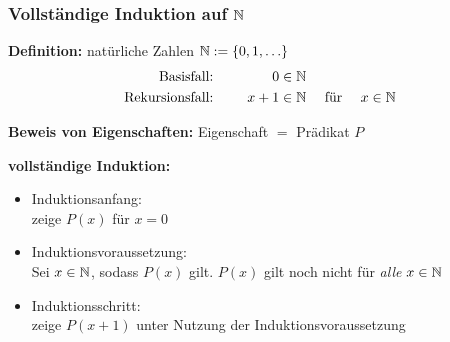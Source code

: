 \documentclass{beamer}
\begin{document}
\begin{frame} \frametitle{Vollständige Induktion auf $\mathbb{N}$}
	\footnotesize
	
	\textbf{Definition:} natürliche Zahlen $\N \defeq \menge{0, 1, \dots}$
	\begin{equation*}
		\begin{aligned}
			\text{Basisfall: } \quad &&0 &\in \mathbb{N} \\
			\text{Rekursionsfall: }\quad &&x + 1 &\in \mathbb{N}
			\quad \text{ für } \quad x \in \mathbb{N}
		\end{aligned}
	\end{equation*}
	
	\textbf{Beweis von Eigenschaften:}
	Eigenschaft $=$ Prädikat $P$
	\begin{center}
	\end{center}
	
	\textbf{vollständige Induktion:}
	\begin{itemize}
		\item \textcolor{cdblue}{Induktionsanfang}: \\
		zeige $P(x)$ für $x = 0$
		\item \textcolor{cdblue}{Induktionsvoraussetzung}:\\
		Sei $x \in \mathbb{N}$, sodass $P(x)$ gilt.
		\hfill
		\textcolor{cdgray}{$P(x)$ gilt noch nicht für \textit{alle} $x \in \mathbb{N}$}
		\item \textcolor{cdblue}{Induktionsschritt}: \\
		zeige $P(x+1)$ unter Nutzung der Induktionsvoraussetzung
	\end{itemize}
\end{frame}
\end{document}
